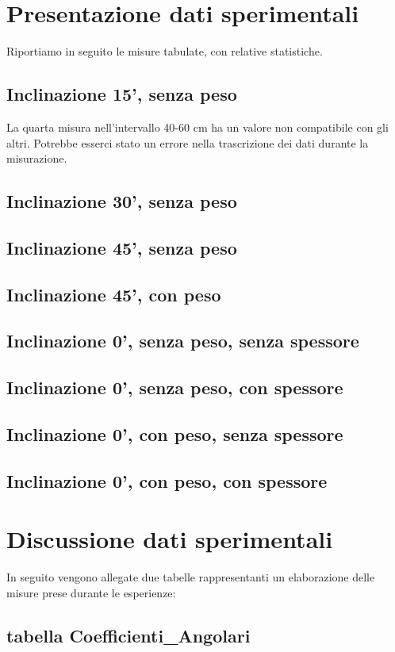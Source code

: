 \documentclass[12pt]{article} %
\begin{document}
\section{Presentazione dati sperimentali}	
	Riportiamo in seguito le misure tabulate, con relative statistiche.
	\subsection {Inclinazione 15', senza peso}
		La quarta misura nell'intervallo 40-60 cm ha un valore non compatibile con gli altri. Potrebbe esserci stato un errore nella 			trascrizione dei dati durante la misurazione. 
	\subsection {Inclinazione 30', senza peso}
	\subsection {Inclinazione 45', senza peso}
	\subsection {Inclinazione 45', con peso}
	\subsection {Inclinazione 0', senza peso, senza spessore}
	\subsection {Inclinazione 0', senza peso, con spessore}
	\subsection {Inclinazione 0', con peso, senza spessore}
	\subsection {Inclinazione 0', con peso, con spessore}
\section{Discussione dati sperimentali}
	In seguito vengono allegate due tabelle rappresentanti un elaborazione delle misure prese durante le esperienze:
	\subsection {tabella Coefficienti_Angolari}
\end{document}
